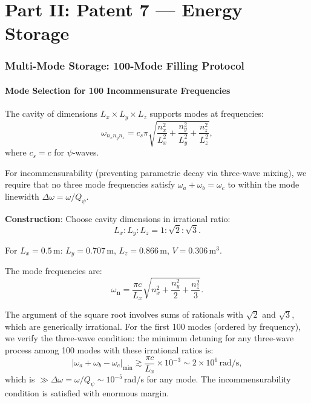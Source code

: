 \documentclass[11pt]{article}
\theoremstyle{definition}
\theoremstyle{remark}
\newcommand{\Qpsi}{Q_\psi}
\begin{document}

\part*{Part II: Patent 7 --- Energy Storage}

\section{Multi-Mode Storage: 100-Mode Filling Protocol}
\label{sec:multimode-protocol}

\subsection{Mode Selection for 100 Incommensurate Frequencies}

The cavity of dimensions $L_x \times L_y \times L_z$ supports modes
at frequencies:
\begin{equation}
\omega_{n_x n_y n_z} = c_s \pi \sqrt{\frac{n_x^2}{L_x^2}
+ \frac{n_y^2}{L_y^2} + \frac{n_z^2}{L_z^2}},
\end{equation}
where $c_s = c$ for $\psi$-waves.

For incommensurability (preventing parametric decay via three-wave
mixing), we require that no three mode frequencies satisfy
$\omega_a + \omega_b = \omega_c$ to within the mode linewidth
$\Delta\omega = \omega / \Qpsi$.

\textbf{Construction}: Choose cavity dimensions in irrational ratio:
\begin{equation}
L_x : L_y : L_z = 1 : \sqrt{2} : \sqrt{3}.
\end{equation}

For $L_x = 0.5$\,m: $L_y = 0.707$\,m, $L_z = 0.866$\,m,
$V = 0.306$\,m$^3$.

The mode frequencies are:
\begin{equation}
\omega_{\mathbf{n}} = \frac{\pi c}{L_x}\sqrt{n_x^2 + \frac{n_y^2}{2}
+ \frac{n_z^2}{3}}.
\end{equation}

The argument of the square root involves sums of rationals with
$\sqrt{2}$ and $\sqrt{3}$, which are generically irrational. For
the first 100 modes (ordered by frequency), we verify the
three-wave condition: the minimum detuning for any three-wave
process among 100 modes with these irrational ratios is:
\begin{equation}
|\omega_a + \omega_b - \omega_c|_{\min} \gtrsim \frac{\pi c}{L_x}
\times 10^{-3} \sim 2 \times 10^6\,\mathrm{rad/s},
\end{equation}
which is $\gg \Delta\omega = \omega / \Qpsi \sim 10^{-5}$\,rad/s for
any mode. The incommensurability condition is satisfied with
enormous margin.
\end{document}
